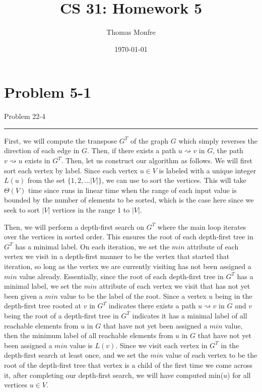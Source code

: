 \documentclass[11pt]{article}
\title{CS 31: Homework 5}
\author{Thomas Monfre}
\date{\today}
\def\separateline{\medskip\hrule\medskip}
\begin{document}
\maketitle

\section{Problem 5-1}
Problem 22-4
\separateline

First, we will compute the transpose $G^T$ of the graph $G$ which simply reverses the direction of each edge in $G$. Then, if there exists a path $u \rightsquigarrow v$ in $G$, the path $v \rightsquigarrow u$ exists in $G^T$. Then, let us construct our algorithm as follows. We will first sort each vertex by label. Since each vertex $u \in V$ is labeled with a unique integer $L(u)$ from the set $\{1,2,...|V|\}$, we can use  to sort the vertices. This will take $\Theta(V)$ time since  runs in linear time when the range of each input value is bounded by the number of elements to be sorted, which is the case here since we seek to sort $|V|$ vertices in the range 1 to $|V|$.

Then, we will perform a depth-first search on $G^T$ where the main loop iterates over the vertices in sorted order. This ensures the root of each depth-first tree in $G^T$ has a minimal label. On each iteration, we set the $min$ attribute of each vertex we visit in a depth-first manner to be the vertex that started that iteration, so long as the vertex we are currently visiting has not been assigned a $min$ value already. Essentially, since the root of each depth-first tree in $G^T$ has a minimal label, we set the $min$ attribute of each vertex we visit that has not yet been given a $min$ value to be the label of the root. Since a vertex $u$ being in the depth-first tree rooted at $v$ in $G^T$ indicates there exists a path $u \rightsquigarrow v$ in $G$ and $v$ being the root of a depth-first tree in $G^T$ indicates it has a minimal label of all reachable elements from $u$ in $G$ that have not yet been assigned a $min$ value, then the minimum label of all reachable elements from $u$ in $G$ that have not yet been assigned a $min$ value is $L(v)$. Since we visit each vertex in $G^T$ in the depth-first search at least once, and we set the $min$ value of each vertex to be the root of the depth-first tree that vertex is a child of the first time we come across it, after completing our depth-first search, we will have computed min($u$) for all vertices $u \in V$.
\end{document}
